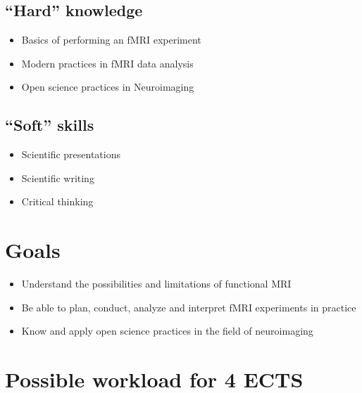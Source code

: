 \documentclass[
  letterpaper,
]{report}
\providecommand{\tightlist}{%
  \setlength{\itemsep}{0pt}\setlength{\parskip}{0pt}}\usepackage{longtable,booktabs,array}
\begin{document}

\subsection*{``Hard'' knowledge}\label{hard-knowledge}

\begin{itemize}
\tightlist
\item
  Basics of performing an fMRI experiment
\item
  Modern practices in fMRI data analysis
\item
  Open science practices in Neuroimaging
\end{itemize}

\subsection*{``Soft'' skills}\label{soft-skills}

\begin{itemize}
\tightlist
\item
  Scientific presentations
\item
  Scientific writing
\item
  Critical thinking
\end{itemize}

\section*{Goals}\label{goals}


\begin{itemize}
\item
  Understand the possibilities and limitations of functional MRI
\item
  Be able to plan, conduct, analyze and interpret fMRI experiments in
  practice
\item
  Know and apply open science practices in the field of neuroimaging
\end{itemize}

\section*{Possible workload for 4
ECTS}\label{possible-workload-for-4-ects}
\end{document}
